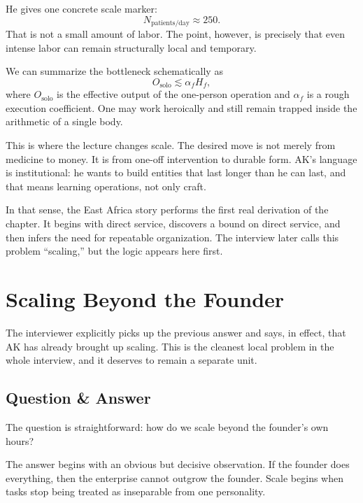 He gives one concrete scale marker:
\begin{equation}
N_{\text{patients/day}} \approx 250.
\end{equation}
That is not a small amount of labor. The point, however, is precisely that even intense labor can remain structurally local and temporary.

We can summarize the bottleneck schematically as
\begin{equation}
O_{\text{solo}} \lesssim \alpha_f H_f,
\end{equation}
where \(O_{\text{solo}}\) is the effective output of the one-person operation and \(\alpha_f\) is a rough execution coefficient. One may work heroically and still remain trapped inside the arithmetic of a single body.

This is where the lecture changes scale. The desired move is not merely from medicine to money. It is from one-off intervention to durable form. AK's language is institutional: he wants to build entities that last longer than he can last, and that means learning operations, not only craft.

In that sense, the East Africa story performs the first real derivation of the chapter. It begins with direct service, discovers a bound on direct service, and then infers the need for repeatable organization. The interview later calls this problem ``scaling,'' but the logic appears here first.

\section{Scaling Beyond the Founder}

The interviewer explicitly picks up the previous answer and says, in effect, that AK has already brought up scaling. This is the cleanest local problem in the whole interview, and it deserves to remain a separate unit.

\subsection{Question \& Answer}

The question is straightforward: how do we scale beyond the founder's own hours?

The answer begins with an obvious but decisive observation. If the founder does everything, then the enterprise cannot outgrow the founder. Scale begins when tasks stop being treated as inseparable from one personality.

